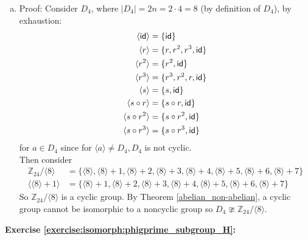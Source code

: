 \begin{enumerate}[(a)]
\item
Proof: Consider $D_4$, where $|D_4| = 2n = 2 \cdot 4 = 8$    (by definition of $D_4$), by exhaustion:
\begin{align*}
\langle \sf{id} \rangle &= \{\sf{id}\}
\\
\langle r \rangle &= \{r, r^2, r^3, \sf{id}\}
\\
\langle r^2 \rangle &= \{r^2, \sf{id}\}
\\
\langle r^3 \rangle &= \{r^3, r^2, r, \sf{id}\}
\\
\langle s \rangle &= \{s, \sf{id}\}
\\
\langle s \circ r \rangle &= \{ s \circ r, \sf{id}\}
\\
\langle s \circ r^2 \rangle &= \{s \circ r^2, \sf{id}\}
\\
\langle s \circ r^3 \rangle &= \{s \circ r^3, \sf{id}\}
\end{align*}
for $a \in D_4$ since for $\langle a \rangle \neq D_4, D_4$ is not cyclic.
\\
Then consider 
\begin{align*}
{\mathbb Z}_{24} / \langle 8 \rangle &= \{ \langle 8 \rangle, \langle 8 \rangle + 1, \langle 8 \rangle + 2, \langle 8 \rangle + 3, \langle 8 \rangle + 4, \langle 8 \rangle + 5, \langle 8 \rangle + 6, \langle 8 \rangle + 7\}
\\
\langle \langle 8 \rangle + 1 \rangle &= \{ \langle 8 \rangle + 1, \langle 8 \rangle + 2, \langle 8 \rangle + 3, \langle 8 \rangle + 4, \langle 8 \rangle + 5, \langle 8 \rangle + 6, \langle 8 \rangle + 7\}
\end{align*}
So ${\mathbb Z}_{24} / \langle 8 \rangle$ is a cyclic group. By Theorem \ref{abelian_non-abelian}, a cyclic group cannot be isomorphic to a noncyclic group so  $D_4 \ncong {\mathbb Z}_{24} / \langle 8 \rangle$.
\end{enumerate}

\noindent\textbf{Exercise \ref{exercise:isomorph:phigprime_subgroup_H}:}

